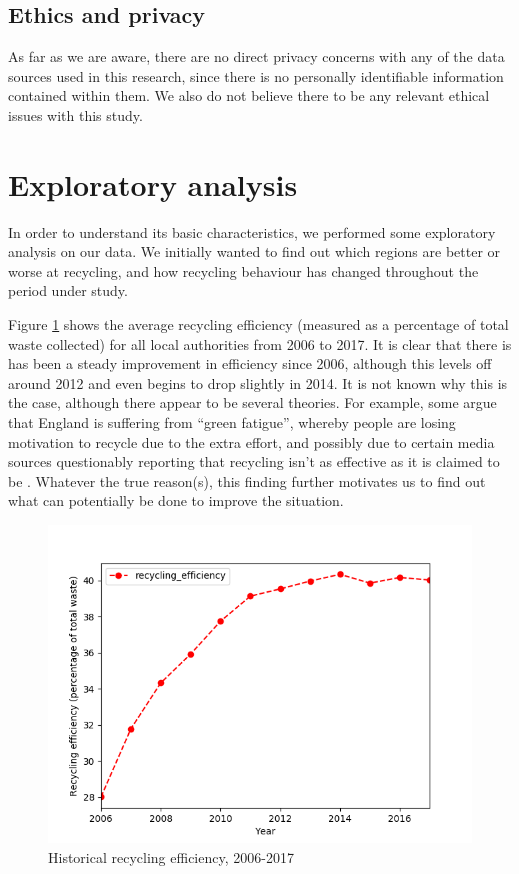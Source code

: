 \documentclass[11pt,conference]{IEEEtran}
\begin{document}
\subsection{Ethics and privacy}
As far as we are aware, there are no direct privacy concerns with any of the data sources used in this research, since there is no personally identifiable information contained within them. We also do not believe there to be any relevant ethical issues with this study.
\section{Exploratory analysis}
In order to understand its basic characteristics, we performed some exploratory analysis on our data. We initially wanted to find out which regions are better or worse at recycling, and how recycling behaviour has changed throughout the period under study.

Figure \ref{fig:hist_rec_eff} shows the average recycling efficiency (measured as a percentage of total waste collected) for all local authorities from 2006 to 2017. It is clear that there is has been a steady improvement in efficiency since 2006, although this levels off around 2012 and even begins to drop slightly in 2014. It is not known why this is the case, although there appear to be several theories. For example, some argue that England is suffering from “green fatigue”, whereby people are losing motivation to recycle due to the extra effort, and possibly due to certain media sources questionably reporting that recycling isn’t as effective as it is claimed to be \cite{gosden_2014}. Whatever the true reason(s), this finding further motivates us to find out what can potentially be done to improve the situation.

\begin{figure}[htbp]
    \begin{center}
        \includegraphics[width=\linewidth]{../figures/england_historical_recycling_efficiency.png}
    \caption{Historical recycling efficiency, 2006-2017}
    \label{fig:hist_rec_eff}
    \end{center}
\end{figure}
\end{document}
